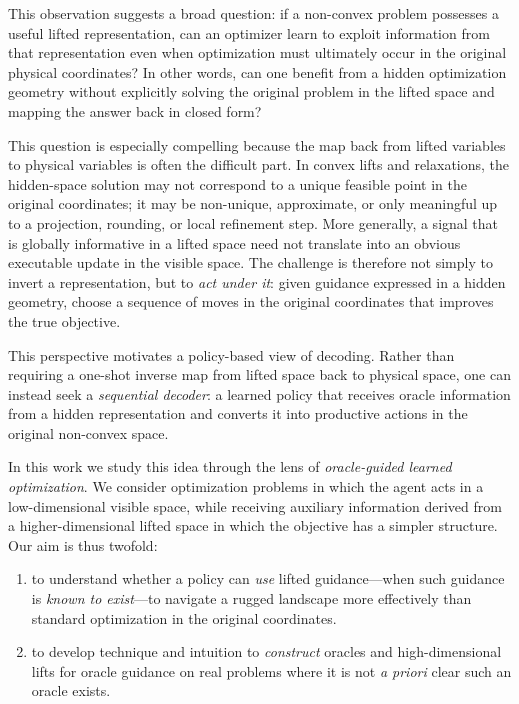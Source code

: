 \documentclass[10pt]{article}
\theoremstyle{definition}
\begin{document}
This observation suggests a broad question: if a non-convex problem possesses a useful lifted representation, can an optimizer learn to exploit information from that representation even when optimization must ultimately occur in the original physical coordinates? In other words, can one benefit from a hidden optimization geometry without explicitly solving the original problem in the lifted space and mapping the answer back in closed form?

This question is especially compelling because the map back from lifted variables to physical variables is often the difficult part. In convex lifts and relaxations, the hidden-space solution may not correspond to a unique feasible point in the original coordinates; it may be non-unique, approximate, or only meaningful up to a projection, rounding, or local refinement step. More generally, a signal that is globally informative in a lifted space need not translate into an obvious executable update in the visible space. The challenge is therefore not simply to invert a representation, but to \emph{act under it}: given guidance expressed in a hidden geometry, choose a sequence of moves in the original coordinates that improves the true objective.

This perspective motivates a policy-based view of decoding. Rather than requiring a one-shot inverse map from lifted space back to physical space, one can instead seek a \emph{sequential decoder}: a learned policy that receives oracle information from a hidden representation and converts it into productive actions in the original non-convex space.

In this work we study this idea through the lens of \emph{oracle-guided learned optimization}. We consider optimization problems in which the agent acts in a low-dimensional visible space, while receiving auxiliary information derived from a higher-dimensional lifted space in which the objective has a simpler structure. 
Our aim is thus twofold:
\begin{enumerate}
    \item to understand whether a policy can \emph{use} lifted guidance---when such guidance is \textit{known to exist}---to navigate a rugged landscape more effectively than standard optimization in the original coordinates.
    \item to develop technique and intuition to \textit{construct} oracles and high-dimensional lifts for oracle guidance on real problems where it is not \emph{a priori} clear such an oracle exists.
\end{enumerate}
\end{document}
